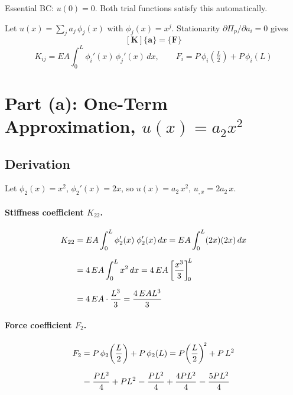 \documentclass[11pt, a4paper]{article}
\begin{document}
Essential BC: $u(0)=0$.  Both trial functions satisfy this automatically.

Let $u(x)=\sum_j a_j\,\phi_j(x)$ with $\phi_j(x)=x^j$.  Stationarity $\partial\Pi_p/\partial a_i=0$ gives
\begin{equation}\label{eq:rr_general}
[\mathbf{K}]\{\mathbf{a}\} = \{\mathbf{F}\}
\end{equation}
\begin{equation}\label{eq:KF_entries}
K_{ij} = EA\int_0^L \phi_i'(x)\,\phi_j'(x)\,dx,\qquad
F_i = P\,\phi_i\!\left(\tfrac{L}{2}\right) + P\,\phi_i(L)
\end{equation}

\section{Part (a): One-Term Approximation, \texorpdfstring{$u(x) = a_2 x^2$}{u(x)=a2 x2}}\label{sec:parta}

\subsection{Derivation}

Let $\phi_2(x)=x^2$, $\phi_2'(x)=2x$, so $u(x)=a_2\,x^2$, $u_{,x}=2a_2\,x$.

\paragraph{Stiffness coefficient $K_{22}$.}
\begin{align}
K_{22} &= EA\int_0^L \phi_2'(x)\;\phi_2'(x)\,dx
       = EA\int_0^L (2x)(2x)\,dx \notag\\[6pt]
       &= 4\,EA\int_0^L x^2\,dx
       = 4\,EA\left[\frac{x^3}{3}\right]_{\!0}^{\!L} \notag\\[6pt]
       &= 4\,EA\cdot\frac{L^3}{3}
       = \frac{4\,EAL^3}{3} \label{eq:K22_a}
\end{align}

\paragraph{Force coefficient $F_2$.}
\begin{align}
F_2 &= P\,\phi_2\!\left(\frac{L}{2}\right) + P\,\phi_2(L)
     = P\!\left(\frac{L}{2}\right)^{\!2} + P\,L^2 \notag\\[6pt]
    &= \frac{PL^2}{4} + PL^2
     = \frac{PL^2}{4} + \frac{4PL^2}{4}
     = \frac{5PL^2}{4} \label{eq:F2_a}
\end{align}
\end{document}
